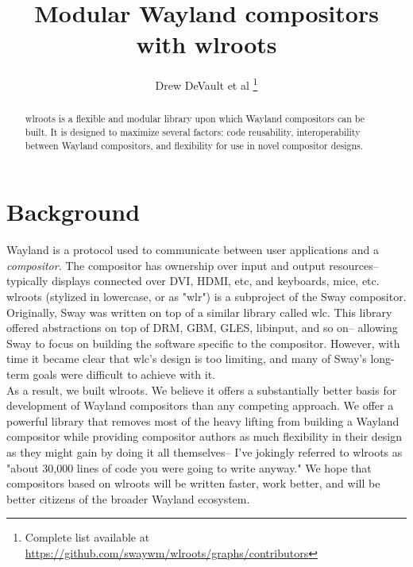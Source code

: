 \documentclass{article}
\begin{document}
\title{Modular Wayland compositors with wlroots}
\author{Drew DeVault et al
    \thanks{Complete list available at \url{https://github.com/swaywm/wlroots/graphs/contributors}}}
\maketitle

\begin{abstract}
wlroots is a flexible and modular library upon which Wayland compositors can be
built. It is designed to maximize several factors: code reusability,
interoperability between Wayland compositors, and flexibility for use in novel
compositor designs.
\end{abstract}

\newpage
\tableofcontents

\newpage
\section{Background}\label{background}

Wayland is a protocol used to communicate between user applications and a
\emph{compositor}. The compositor has ownership over input and output
resources-- typically displays connected over DVI, HDMI, etc, and keyboards,
mice, etc.\\

wlroots (stylized in lowercase, or as "wlr") is a subproject of the Sway
compositor. Originally, Sway was written on top of a similar library called wlc.
This library offered abstractions on top of DRM, GBM, GLES, libinput, and so
on-- allowing Sway to focus on building the software specific to the compositor.
However, with time it became clear that wlc's design is too limiting, and many
of Sway's long-term goals were difficult to achieve with it.\\

As a result, we built wlroots. We believe it offers a substantially better
basis for development of Wayland compositors than any competing approach.
We offer a powerful library that removes most of the heavy lifting from building
a Wayland compositor while providing compositor authors as much flexibility in
their design as they might gain by doing it all themselves-- I've jokingly
referred to wlroots as
"about 30,000 lines of code you were going to write anyway." We hope that
compositors based on wlroots will be written faster, work better, and will
be better citizens of the broader Wayland ecosystem.
\end{document}
